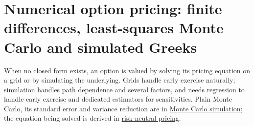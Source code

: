\section{Numerical option pricing: finite differences, least-squares Monte Carlo and simulated Greeks}

When no closed form exists, an option is valued by solving its pricing equation on a grid or by simulating the underlying. Grids handle early exercise naturally; simulation handles path dependence and several factors, and needs regression to handle early exercise and dedicated estimators for sensitivities. Plain Monte Carlo, its standard error and variance reduction are in \hyperref[meth:monte-carlo-simulation]{Monte Carlo simulation}; the equation being solved is derived in \hyperref[res:risk-neutral-pricing-feynman-kac]{risk-neutral pricing}.

